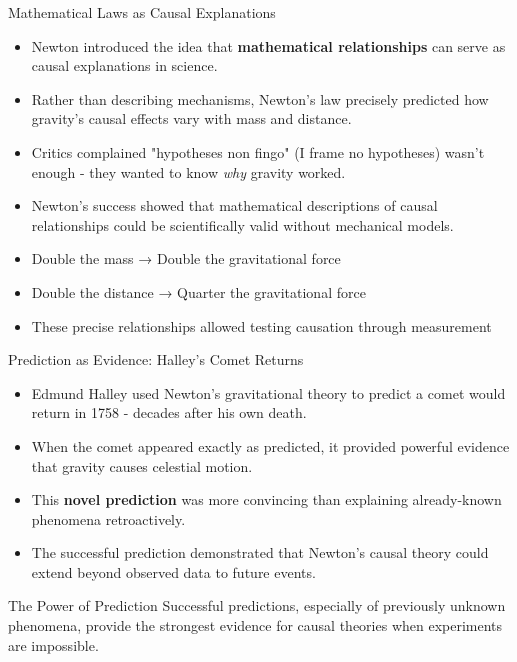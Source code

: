 \documentclass{beamer}
\begin{document}
	\begin{frame}{Mathematical Laws as Causal Explanations}
		\begin{itemize}
			\item Newton introduced the idea that \textbf{mathematical relationships} can serve as causal explanations in science.
			\item Rather than describing mechanisms, Newton's law precisely predicted how gravity's causal effects vary with mass and distance.
			\item Critics complained "hypotheses non fingo" (I frame no hypotheses) wasn't enough - they wanted to know \textit{why} gravity worked.
			\item Newton's success showed that mathematical descriptions of causal relationships could be scientifically valid without mechanical models.
		\end{itemize}
		
		\begin{example}
			\begin{itemize}
				\item Double the mass → Double the gravitational force
				\item Double the distance → Quarter the gravitational force  
				\item These precise relationships allowed testing causation through measurement
			\end{itemize}
		\end{example}
	\end{frame}
	
	\begin{frame}{Prediction as Evidence: Halley's Comet Returns}
		\begin{itemize}
			\item Edmund Halley used Newton's gravitational theory to predict a comet would return in 1758 - decades after his own death.
			\item When the comet appeared exactly as predicted, it provided powerful evidence that gravity causes celestial motion.
			\item This \textbf{novel prediction} was more convincing than explaining already-known phenomena retroactively.
			\item The successful prediction demonstrated that Newton's causal theory could extend beyond observed data to future events.
		\end{itemize}
		
		\begin{alertblock}{The Power of Prediction}
			Successful predictions, especially of previously unknown phenomena, provide the strongest evidence for causal theories when experiments are impossible.
		\end{alertblock}
	\end{frame}
	
\end{document}
